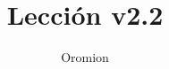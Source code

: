 \documentclass[10pt]{article}
\author{Oromion}
\title{Lección v2.2}
\begin{document}
\maketitle

\begin{abstract}
	\lipsum[1-6]
\end{abstract}

\begin{landscape}
	\lipsum[3]
\end{landscape}
\end{document}
